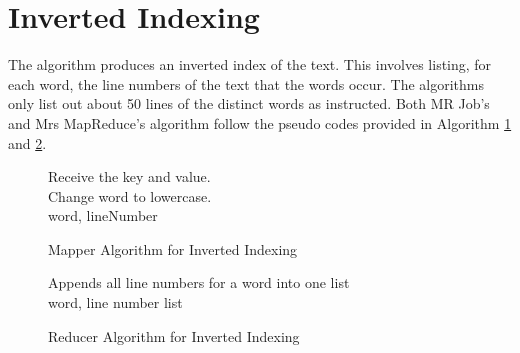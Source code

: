 \documentclass[10pt, twocolumn]{article}
\makeatletter
\newcommand{\removelatexerror}{\let\@latex@error\@gobble}
\makeatother
\begin{document}
\section{Inverted Indexing}
The algorithm produces an inverted index of the text. This involves listing, for each word, the line numbers
of the text that the words occur. The algorithms only list out about 50 lines of the distinct words as instructed. Both MR Job's and Mrs MapReduce's algorithm follow the pseudo codes provided in Algorithm \ref*{Alg:MapperInvertedIndexing} and \ref*{Alg:ReducerInvertedIndexing}.
\begin{figure}[H]
     \removelatexerror
    \begin{algorithm}[H]
       \label{Alg:MapperInvertedIndexing}
        \caption{Mapper Algorithm for Inverted Indexing}
        Receive the key and value.\\
        {   
            Change word to lowercase.\\
            {
                \Return word, lineNumber
            }
        }
        
    \end{algorithm}
\end{figure}
\begin{figure}[H]
     \removelatexerror
    \begin{algorithm}[H]
       \label{Alg:ReducerInvertedIndexing}
        \caption{Reducer Algorithm for Inverted Indexing}
        Appends all line numbers for a word into one list\\
        \Return word, line number list
    \end{algorithm}
\end{figure}
\end{document}
